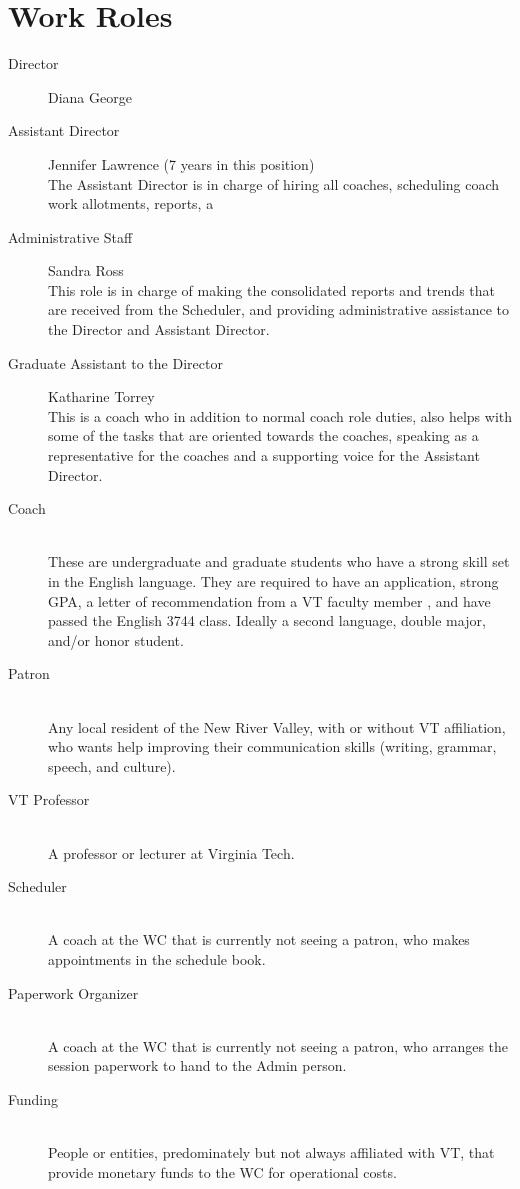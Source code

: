 \documentclass[12pt]{article} %
\begin{document}
\section{Work Roles} %
  \begin{description} %
  \item[Director]
  Diana George
  \item[Assistant Director]
  Jennifer Lawrence (7 years in this position)\\
  The Assistant Director is in charge of hiring all coaches, scheduling coach work allotments, reports, a
  \item[Administrative Staff]
  Sandra Ross \\
  This role is in charge of making the consolidated reports and trends that are received from the Scheduler, and providing administrative assistance to the Director and Assistant Director. 
  \item[Graduate Assistant to the Director]
  Katharine Torrey \\
  This is a coach who in addition to normal coach role duties, also helps with some of the tasks that are oriented towards the coaches, speaking as a representative for the coaches and a supporting voice for the Assistant Director.
  \item[Coach] \hfill \\
  These are undergraduate and graduate students who have a strong skill set in the English language.
  They are required to have an application, strong GPA, a letter of recommendation from a VT faculty member , and have passed the English 3744 class.
  Ideally a second language, double major, and/or honor student.
  \item[Patron] \hfill \\
  Any local resident of the New River Valley, with or without VT affiliation, who wants help improving their communication skills (writing, grammar, speech, and culture).
  \item[VT Professor] \hfill \\
  A professor or lecturer at Virginia Tech.
  \item[Scheduler] \hfill \\
  A coach at the WC that is currently not seeing a patron, who makes appointments in the schedule book.
  \item[Paperwork Organizer] \hfill \\
  A coach at the WC that is currently not seeing a patron, who arranges the session paperwork to hand to the Admin person.
  \item[Funding] \hfill \\
  People or entities, predominately but not always affiliated with VT, that provide monetary funds to the WC for operational costs.
  \end{description} 
\end{document}
